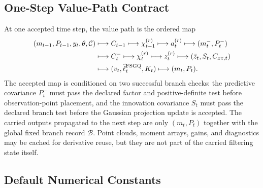 \subsection{One-Step Value-Path Contract}
\label{sec:bf-hd-sgqf-one-step-value-contract}

At one accepted time step, the value path is the ordered map
\begin{equation}
\begin{aligned}
  (m_{t-1},P_{t-1},y_t,\theta,\mathcal C)
  &\longmapsto C_{t-1}
  \longmapsto \chi_{t-1}^{(r)}
  \longmapsto a_t^{(r)}
  \longmapsto (m_t^-,P_t^-) \\
  &\longmapsto C_t^-
  \longmapsto \chi_t^{(r)}
  \longmapsto z_t^{(r)}
  \longmapsto (\bar z_t,S_t,C_{xz,t}) \\
  &\longmapsto (v_t,\widehat\ell_t^{\rm FSGQ},K_t)
  \longmapsto (m_t,P_t).
\end{aligned}
  \label{eq:bf-hd-sgqf-one-step-value-map}
\end{equation}
The accepted map is conditioned on two successful branch checks: the predictive
covariance \(P_t^-\) must pass the declared factor and positive-definite test
before observation-point placement, and the innovation covariance \(S_t\) must
pass the declared branch test before the Gaussian projection update is accepted.
The carried outputs propagated to the next step are only \((m_t,P_t)\) together
with the global fixed branch record \(\mathcal B\).  Point clouds, moment arrays,
gains, and diagnostics may be cached for derivative reuse, but they are not part
of the carried filtering state itself.

\subsection{Default Numerical Constants}
\label{sec:bf-hd-sgqf-defaults}

